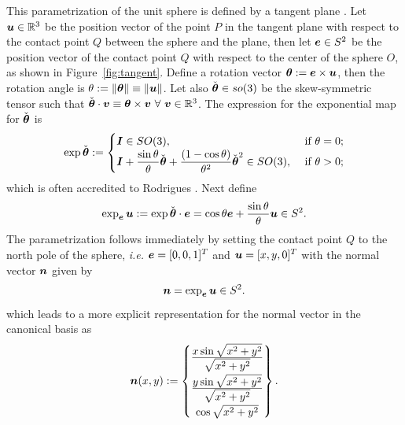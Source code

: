 \documentclass[12pt]{article}
\numberwithin{equation}{section}
\begin{document}
This parametrization of the unit sphere is defined by a tangent plane
\citep{Simo.Fox:1989}. Let ${\boldsymbol{u}}\in \mathbb{R}^3$ be the position vector
of the point $P$ in the tangent plane with respect to the contact
point $Q$ between the sphere and the plane, then let ${\boldsymbol{e}} \in S^2$ be
the position vector of the contact point $Q$ with respect to the
center of the sphere $O$, as shown in Figure~\ref{fig:tangent}. Define
a rotation vector ${\boldsymbol{\theta}} := {\boldsymbol{e}} \times {\boldsymbol{u}}$, then the rotation angle
is $\theta := \| {\boldsymbol{\theta}} \| \equiv \| {\boldsymbol{u}} \|$. Let also
$\check{{\boldsymbol{\theta}}} \in so(3)$ be the skew-symmetric tensor such that
$\check{{\boldsymbol{\theta}}} \cdot {\boldsymbol{v}} \equiv {\boldsymbol{\theta}} \times {\boldsymbol{v}} \ \forall \ {\boldsymbol{v}}
\in \mathbb{R}^3$. The expression for the exponential map for
$\check{{\boldsymbol{\theta}}}$ is
\begin{equation}
  \exp \check{{\boldsymbol{\theta}}}
  :=
  \begin{cases}
    {\boldsymbol{I}} \in SO(3),
    &
    \text{ if }\theta = 0;
    \\
    \displaystyle{
      {\boldsymbol{I}}+ \frac{\sin \theta}{\theta} \check{{\boldsymbol{\theta}}} +
      \frac{(1 - \cos \theta)}{\theta^2} \check{{\boldsymbol{\theta}}}^2 \in SO(3),
    }
    &
    \text{ if }\theta > 0;
  \end{cases}
  \label{eq:Rodrigues-formula}
\end{equation}
which is often accredited to Rodrigues
\citep{Gallier:2011}. Next define
\begin{equation}
  \exp_{{\boldsymbol{e}}} {\boldsymbol{u}}
  :=
  \exp \check{{\boldsymbol{\theta}}} \cdot {\boldsymbol{e}}
  =
  \cos \theta {\boldsymbol{e}} + \frac{\sin \theta}{\theta}
  {\boldsymbol{u}} \in S^2.
\end{equation}
The parametrization follows immediately by setting the contact point
$Q$ to the north pole of the sphere, \emph{i.e.} ${\boldsymbol{e}} = [0,0,1]^T$ and
${\boldsymbol{u}} = [x,y,0]^T$ with the normal vector ${\boldsymbol{n}}$ given by
\begin{equation}
  {\boldsymbol{n}}
  =
  \exp_{{\boldsymbol{e}}} {\boldsymbol{u}} \in S^2.
\end{equation}
which leads to a more explicit representation for the normal vector in
the canonical basis as
\begin{equation}
  {\boldsymbol{n}}(x,y)
  := 
  \begin{Bmatrix}
    \frac{\displaystyle x \sin \sqrt{x^2+y^2}}{\displaystyle \sqrt{x^2+y^2}}
    \\[0.9em]
    \frac{\displaystyle y \sin \sqrt{x^2+y^2}}{\displaystyle \sqrt{x^2+y^2}}
    \\[0.9em]
    \cos \sqrt{x^2+y^2}
  \end{Bmatrix}.
\end{equation}
\end{document}
